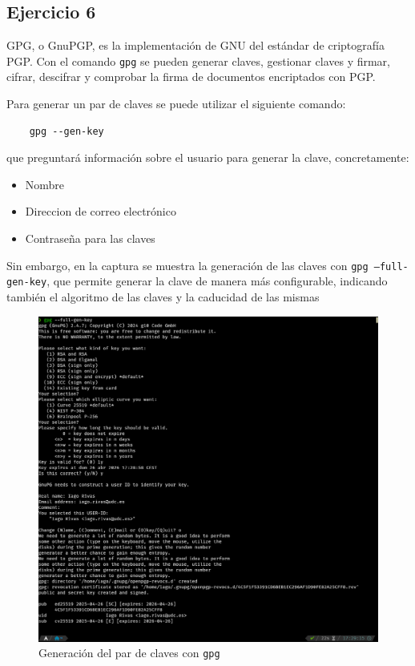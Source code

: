 \subsection{Ejercicio 6}
\graphicspath{ {img/06} }

GPG, o GnuPGP, es la implementación de GNU del estándar de criptografía PGP. Con el comando \texttt{gpg} se pueden generar claves, gestionar claves y firmar, cifrar, descifrar y comprobar la firma de documentos encriptados con PGP.

Para generar un par de claves se puede utilizar el siguiente comando:
\begin{verbatim}
    gpg --gen-key
\end{verbatim}

que preguntará información sobre el usuario para generar la clave, concretamente:
\begin{itemize}
    \item{Nombre}
    \item{Direccion de correo electrónico}
    \item{Contraseña para las claves}
\end{itemize}

Sin embargo, en la captura se muestra la generación de las claves con \texttt{gpg --full-gen-key}, que permite generar la clave de manera más configurable, indicando también el algoritmo de las claves y la caducidad de las mismas

\begin{figure}[H]
    \includegraphics[width=\textwidth]{gpg-genkey.png}
    \caption{Generación del par de claves con \texttt{gpg}}
\end{figure}

